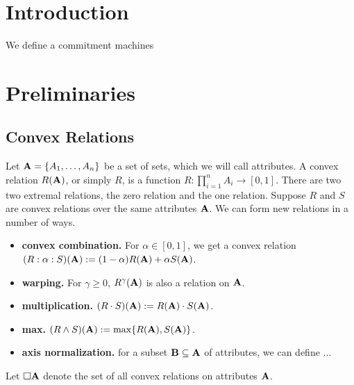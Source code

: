 \documentclass{article}
\begin{document}
    \section{Introduction}
    
    We define a commitment machines
    
    \section{Preliminaries}
    
    
    \subsection*{Convex Relations}
    Let $\mathbf{A} = \{ A_1, \ldots, A_n \}$ be a set of sets, which we will call attributes.
    A convex relation $R(\mathbf{A})$, or simply $R$,  is a function
        $R : \prod_{i=1}^n A_i \to [0,1]$.
    There are two two extremal relations, the zero relation and the one relation.
    Suppose $R$ and $S$ are convex relations over the same attributes $\mathbf{A}$. We can form new relations in a number of ways.
    \begin{itemize}
        \item \textbf{convex combination.} For $\alpha \in [0,1]$, we get a convex relation $(R : \alpha : S)(\mathbf{A}) := (1-\alpha) R(\mathbf{A}) + \alpha S(\mathbf{A})$.
        \item \textbf{warping.} For $\gamma \ge 0$,  $R^\gamma(\mathbf{A})$ is also a relation on $\mathbf{A}$.
        \item \textbf{multiplication.} $(R \cdot S)(\mathbf{A}) := R(\mathbf{A}) \cdot S(\mathbf{A})$.
        \item \textbf{max.} $(R \land S)(\mathbf{A}) := \max \{ R(\mathbf{A}),  S(\mathbf{A}) \}$.
        \item \textbf{axis normalization.} for a subset $\mathbf{B} \subseteq \mathbf{A}$ of attributes, we can define ...
        
        \TODO
        
    \end{itemize}
    Let $\square \mathbf{A}$ denote the set of all convex relations on attributes $\mathbf{A}$. 
    
\end{document}
